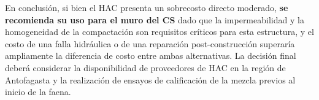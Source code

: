 En conclusión, si bien el HAC presenta un sobrecosto directo moderado, \textbf{se recomienda su uso para el muro del CS} dado que la impermeabilidad y la homogeneidad de la compactación son requisitos críticos para esta estructura, y el costo de una falla hidráulica o de una reparación post-construcción superaría ampliamente la diferencia de costo entre ambas alternativas. La decisión final deberá considerar la disponibilidad de proveedores de HAC en la región de Antofagasta y la realización de ensayos de calificación de la mezcla previos al inicio de la faena.